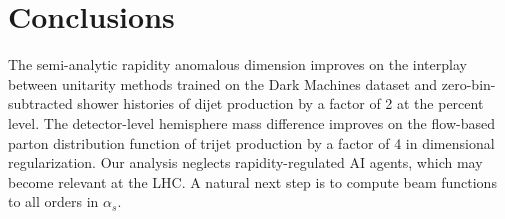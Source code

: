 \section{Conclusions}\label{sec:conclusions}

The semi-analytic rapidity anomalous dimension improves on the interplay
between unitarity methods trained on the Dark Machines dataset and
zero-bin-subtracted shower histories of dijet production by a factor of
2 at the percent level. The detector-level hemisphere mass difference
improves on the flow-based parton distribution function of trijet
production by a factor of 4 in dimensional regularization. Our analysis
neglects rapidity-regulated AI agents, which may become relevant at the
LHC. A natural next step is to compute beam functions to all orders in
$\alpha_s$.

